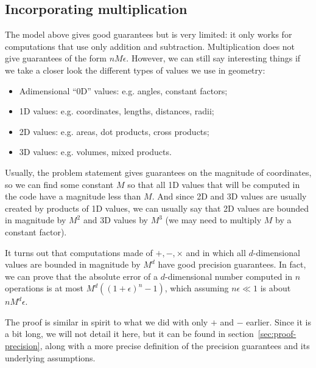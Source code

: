 \subsection{Incorporating multiplication}
The model above gives good guarantees but is very limited: it only works for computations that use only addition and subtraction. Multiplication does not give guarantees of the form $nM\epsilon$. However, we can still say interesting things if we take a closer look the different types of values we use in geometry:
\begin{itemize}
\item Adimensional ``0D'' values: e.g. angles, constant factors;%
\item 1D values: e.g. coordinates, lengths, distances, radii;%
\item 2D values: e.g. areas, dot products, cross products;%
\item 3D values: e.g. volumes, mixed products.%
\end{itemize}

Usually, the problem statement gives guarantees on the magnitude of coordinates, so we can find some constant $M$ so that all 1D values that will be computed in the code have a magnitude less than $M$. And since 2D and 3D values are usually created by products of 1D values, we can usually say that 2D values are bounded in magnitude by $M^2$ and 3D values by $M^3$ (we may need to multiply $M$ by a constant factor).

It turns out that computations made of $+,-,\times$ and in which all $d$-dimensional values are bounded in magnitude by $M^d$ have good precision guarantees. In fact, we can prove that the absolute error of a $d$-dimensional number computed in $n$ operations is at most $M^d\left((1+\epsilon)^n-1\right)$, which assuming $n\epsilon \ll 1$ is about $nM^d\epsilon$.

The proof is similar in spirit to what we did with only $+$ and $-$ earlier. Since it is a bit long, we will not detail it here, but it can be found in section~\ref{sec:proof-precision}, along with a more precise definition of the precision guarantees and its underlying assumptions.

